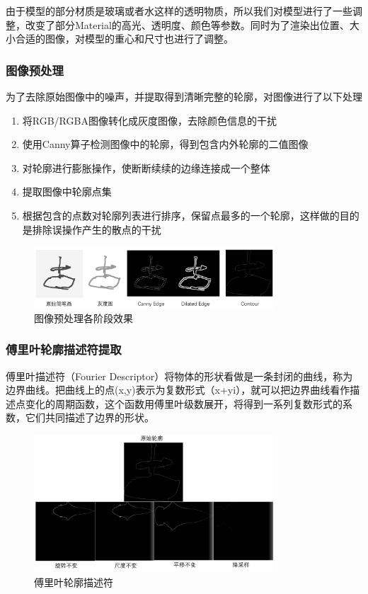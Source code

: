 \documentclass{article}
\begin{document}
由于模型的部分材质是玻璃或者水这样的透明物质，所以我们对模型进行了一些调整，改变了部分Material的高光、透明度、颜色等参数。同时为了渲染出位置、大小合适的图像，对模型的重心和尺寸也进行了调整。

\subsubsection{图像预处理}
为了去除原始图像中的噪声，并提取得到清晰完整的轮廓，对图像进行了以下处理

\begin{enumerate}
    \item 将RGB/RGBA图像转化成灰度图像，去除颜色信息的干扰
    \item 使用Canny算子检测图像中的轮廓，得到包含内外轮廓的二值图像
    \item 对轮廓进行膨胀操作，使断断续续的边缘连接成一个整体
    \item 提取图像中轮廓点集
    \item 根据包含的点数对轮廓列表进行排序，保留点最多的一个轮廓，这样做的目的是排除误操作产生的散点的干扰
\end{enumerate}

\begin{figure}[htb]
    \centering
    \includegraphics[width=0.8\textwidth]{images/contour.png}
    \caption{图像预处理各阶段效果}\label{fig:digit}
\end{figure} 

\subsubsection{傅里叶轮廓描述符提取}
傅里叶描述符（Fourier Descriptor）将物体的形状看做是一条封闭的曲线，称为边界曲线。把曲线上的点(x,y)表示为复数形式（x+yi），就可以把边界曲线看作描述点变化的周期函数，这个函数用傅里叶级数展开，将得到一系列复数形式的系数，它们共同描述了边界的形状。

\begin{figure}[htb]
    \centering
    \includegraphics[width=0.8\textwidth]{images/Fourier.png}
    \caption{傅里叶轮廓描述符}\label{fig:digit}
\end{figure} 
\end{document}
